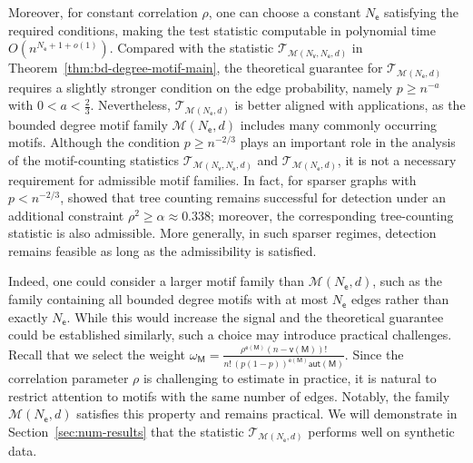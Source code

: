\documentclass[letterpaper,11pt]{article}
\theoremstyle{definition}
\newcommand{\maM}{\mathcal{M}}
\newcommand{\maP}{\mathcal{P}}
\newcommand{\maT}{\mathcal{T}}
\newcommand{\nbr}[1]{{\sf\color{red}[#1]}}
\newcommand{\en}{\mathsf{{e}}}
\newcommand{\vn}{\mathsf{{v}}}
\newcommand{\pth}[1]{\left( #1 \right)}
\newcommand{\qth}[1]{\left[ #1 \right]}
\newcommand{\sth}[1]{\left\{ #1 \right\}}
\newcommand{\sfM}{{\mathsf{M}}}
\newcommand{\sfe}{{\mathsf{e}}}
\newcommand{\sfv}{{\mathsf{v}}}
\newcommand{\ER}{Erd\H{o}s-R\'enyi }
\newcommand{\aut}{\mathsf{aut}}
\def\var{\mathrm{Var}}
\def\E{\mathbb{E}}
\begin{document}
Moreover, for constant correlation $\rho$, one can choose a constant $N_\sfe$ satisfying the required conditions, making the test statistic computable in polynomial time $O(n^{N_\sfe+1+o(1)})$. %
Compared with the statistic $\maT_{\maM(N_\sfv,N_\sfe,d)}$ in Theorem~\ref{thm:bd-degree-motif-main}, the theoretical guarantee for $\maT_{\maM(N_\sfe,d)}$ requires a slightly stronger condition on the edge probability, namely $p \ge n^{-a}$ with $0<a<\frac{2}{3}$. Nevertheless, $\maT_{\maM(N_\sfe,d)}$ is better aligned with applications, as the bounded degree motif family $\maM(N_\sfe,d)$ includes many commonly occurring motifs. 
Although the condition $p \ge n^{-2/3}$ plays an important role in the analysis of the motif-counting statistics $\maT_{\maM(N_\sfv, N_\sfe,d)}$ and $\maT_{\maM(N_\sfe,d)}$, it is not a necessary requirement for admissible motif families. In fact, for sparser graphs with $p < n^{-2/3}$, \cite{mao2024testing} showed that tree counting remains successful for detection under an additional constraint $\rho^2 \ge \alpha \approx 0.338$; moreover, the corresponding tree-counting statistic is also admissible. More generally, in such sparser regimes, detection remains feasible as long as the admissibility is satisfied.

Indeed, one could consider a larger motif family than $\maM(N_\sfe,d)$, such as the family containing all bounded degree motifs with at most $N_\sfe$ edges rather than exactly $N_\sfe$. While this would increase the signal and the theoretical guarantee could be established similarly, such a choice may introduce practical challenges.
Recall that we select the weight $\omega_\sfM = \frac{\rho^{\en(\sfM)} (n-\vn(\sfM))!}{n!\,(p(1-p))^{\en(\sfM)}\aut(\sfM)}.$
Since the correlation parameter $\rho$ is challenging to estimate in practice, it is natural to restrict attention to motifs with the same number of edges. Notably, the family $\maM(N_\sfe,d)$ satisfies this property and remains practical. We will demonstrate in Section~\ref{sec:num-results} that the statistic $\maT_{\maM(N_\sfe,d)}$ performs well on synthetic data.




 
\end{document}
